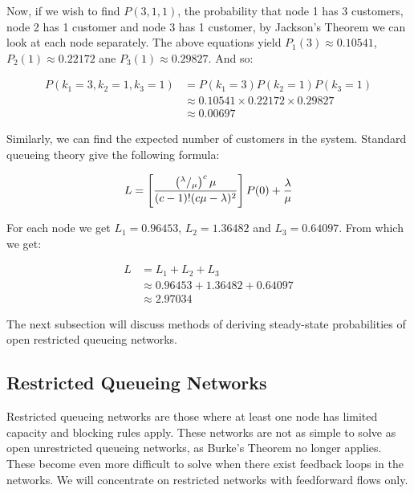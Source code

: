 \documentclass{article}
\begin{document}
Now, if we wish to find $P(3, 1, 1)$, the probability that node 1 has 3
customers, node 2 has 1 customer and node 3 has 1 customer, by Jackson's Theorem
we can look at each node separately.
The above equations yield $P_1(3) \approx 0.10541$, $P_2(1) \approx 0.22172$ ane $P_3(1) \approx 0.29827$.
And so:

\begin{equation*}
    \begin{split}
    P( k_1 = 3, k_2 = 1, k_3 = 1 ) & = P(k_1 = 3) P(k_2 = 1) P(k_3 = 1) \\
    & \approx 0.10541 \times 0.22172 \times 0.29827 \\
    & \approx 0.00697
    \end{split}
\end{equation*}

Similarly, we can find the expected number of customers in the system. Standard queueing theory give the following formula:

\begin{equation}
    L = \left[ { \left( ^\lambda / _\mu \right)^c \mu \over (c - 1)! (c \mu - \lambda)^2 } \right] P(0) + \frac{\lambda}{\mu}
\end{equation}

For each node we get $L_1 = 0.96453$, $L_2 = 1.36482$ and $L_3 = 0.64097$.
From which we get:

\begin{equation*}
    \begin{split}
    L & = L_1 + L_2 + L_3\\
    & \approx 0.96453 + 1.36482 + 0.64097 \\
    & \approx 2.97034
    \end{split}
\end{equation*}

The next subsection will discuss methods of deriving steady-state probabilities of open restricted queueing networks.

\subsection{Restricted Queueing Networks}

Restricted queueing networks are those where at least one node has limited capacity and blocking rules apply.
These networks are not as simple to solve as open unrestricted queueing networks, as Burke's Theorem no longer applies.
These become even more difficult to solve when there exist feedback loops in the networks.
We will concentrate on restricted networks with feedforward flows only.
\end{document}
